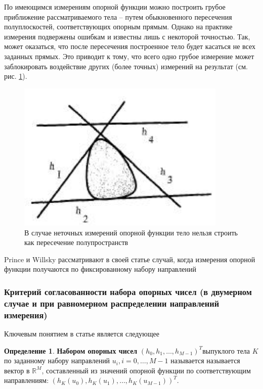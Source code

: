 \documentclass[a4paper, 12pt, titlepage]{article}
\theoremstyle{definition}
\newtheorem{SmartDefinition}{Определение}
\theoremstyle{plain}
\theoremstyle{plain}
\begin{document}
По имеющимся измерениям опорной функции можно построить грубое приближение
рассматриваемого тела -- путем обыкновенного пересечения полуплоскостей,
соответствующих опорным прямым. Однако на практике измерения подвержены
ошибкам и известны лишь с некоторой точностью. Так, может оказаться, что
после пересечения построенное тело будет касаться не всех заданных прямых.
Это приводит к тому, что всего одно грубое измерение может заблокировать
воздействие других (более точных) измерений на результат (см. рис.
\ref{inconsistent}).

\begin{figure}[ht]
    \includegraphics[width=10cm]{images/inconsistent-support-planes.jpg}
    \caption{В случае неточных измерений опорной функции тело нельзя строить
    как пересечение полупространств}
    \label{inconsistent}
\end{figure}

Prince и Willsky рассматривают в своей статье случай, когда измерения опорной
функции получаются по фиксированному набору направлений

\subsubsection{Критерий согласованности набора опорных чисел (в двумерном
случае и при равномерном распределении направлений измерения)}

Ключевым понятием в статье является следующее

\begin{SmartDefinition}
 \label{def:support-vector}
 \textbf{Набором опорных чисел}
 $(h_{0}, h_{1}, \ldots, h_{M - 1})^{T}$выпуклого тела $K$ по заданному набору
 направлений $u_{i}, i = 0, \ldots, M - 1$ называется называется вектор в
 $\mathbb{R}^{M}$, составленный из значений опорной функции по соответствующим
 направлениям: $(h_{K}(u_{0}), h_{K}(u_{1}), \ldots, h_{K}(u_{M - 1}))^{T}$.
\end{SmartDefinition}
\end{document}
